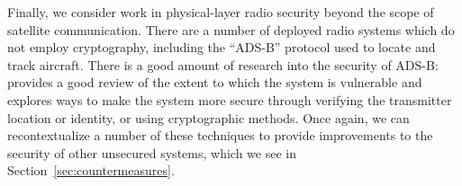 Finally, we consider work in physical-layer radio security beyond the scope of satellite communication.
There are a number of deployed radio systems which do not employ cryptography, including the ``ADS-B'' protocol used to locate and track aircraft.
There is a good amount of research into the security of ADS-B: \cite{strohmeierSecurity2015} provides a good review of the extent to which the system is vulnerable and explores ways to make the system more secure through verifying the transmitter location or identity, or using cryptographic methods.
Once again, we can recontextualize a number of these techniques to provide improvements to the security of other unsecured systems, which we see in Section~\ref{sec:countermeasures}.

